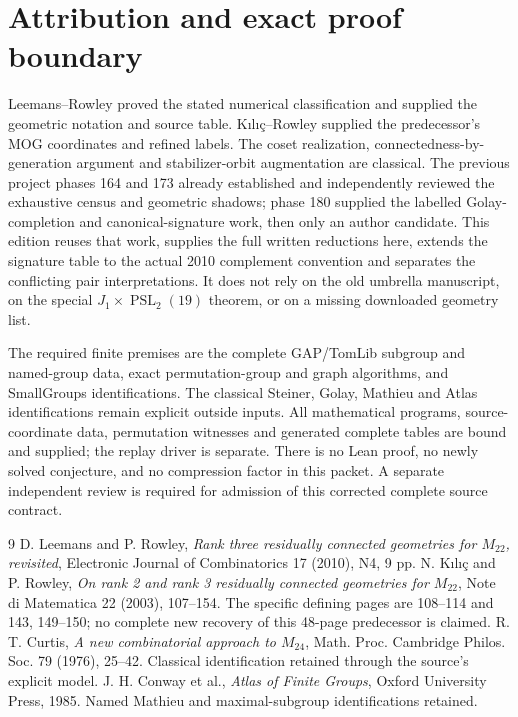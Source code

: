 \documentclass[11pt,a4paper]{article}
\begin{document}
\section{Attribution and exact proof boundary}
Leemans--Rowley proved the stated numerical classification and supplied the geometric notation and source table. Kılıç--Rowley supplied the predecessor's MOG coordinates and refined labels. The coset realization, connectedness-by-generation argument and stabilizer-orbit augmentation are classical. The previous project phases 164 and 173 already established and independently reviewed the exhaustive census and geometric shadows; phase 180 supplied the labelled Golay-completion and canonical-signature work, then only an author candidate. This edition reuses that work, supplies the full written reductions here, extends the signature table to the actual 2010 complement convention and separates the conflicting pair interpretations. It does not rely on the old umbrella manuscript, on the special $J_1\times\operatorname{PSL}_2(19)$ theorem, or on a missing downloaded geometry list.

The required finite premises are the complete GAP/TomLib subgroup and named-group data, exact permutation-group and graph algorithms, and SmallGroups identifications. The classical Steiner, Golay, Mathieu and Atlas identifications remain explicit outside inputs. All mathematical programs, source-coordinate data, permutation witnesses and generated complete tables are bound and supplied; the replay driver is separate. There is no Lean proof, no newly solved conjecture, and no compression factor in this packet. A separate independent review is required for admission of this corrected complete source contract.

\begin{thebibliography}{9}
 D. Leemans and P. Rowley, \emph{Rank three residually connected geometries for $M_{22}$, revisited}, Electronic Journal of Combinatorics 17 (2010), N4, 9 pp.
 N. Kılıç and P. Rowley, \emph{On rank 2 and rank 3 residually connected geometries for $M_{22}$}, Note di Matematica 22 (2003), 107--154. The specific defining pages are 108--114 and 143, 149--150; no complete new recovery of this 48-page predecessor is claimed.
 R. T. Curtis, \emph{A new combinatorial approach to $M_{24}$}, Math. Proc. Cambridge Philos. Soc. 79 (1976), 25--42. Classical identification retained through the source's explicit model.
 J. H. Conway et al., \emph{Atlas of Finite Groups}, Oxford University Press, 1985. Named Mathieu and maximal-subgroup identifications retained.
\end{thebibliography}
\end{document}
